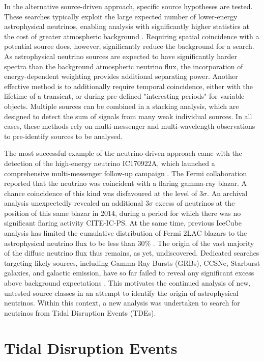 \documentclass{PoS}
\begin{document}
In the alternative source-driven approach, specific source hypotheses are tested. These searches typically exploit the large expected number of lower-energy astrophysical neutrinos, enabling analysis with significantly higher statistics at the cost of greater atmospheric background \cite{Aartsen:2016oji}. Requiring spatial coincidence with a potential source does, however, significantly reduce the background for a search. As astrophysical neutrino sources are expected to have significantly harder spectra than the background atmospheric neutrino flux, the incorporation of energy-dependent weighting provides additional separating power. Another effective method is to additionally require temporal coincidence, either with the lifetime of a transient, or during  pre-defined "interesting periods" for variable objects.  Multiple sources can be combined in a stacking analysis, which are designed to detect the sum of signals from many weak individual sources. In all cases, these methods rely on multi-messenger and multi-wavelength observations to pre-identify sources to be analysed.

The most successful example of the neutrino-driven approach came with the detection of the high-energy neutrino IC170922A, which launched a comprehensive multi-messenger follow-up campaign \cite{IceCube:2018dnn}. The Fermi collaboration reported that the neutrino was coincident with a flaring gamma-ray blazar. A chance coincidence of this kind was disfavoured at the level of 3$\sigma$. An archival analysis unexpectedly revealed an additional 3$\sigma$ excess of neutrinos at the position of this same blazar in 2014, during a period for which there was no significant flaring activity CITE-IC-PS. At the same time, previous IceCube analysis has limited the cumulative distribution of Fermi 2LAC blazars to the astrophysical neutrino flux to be less than 30\% \cite{Aartsen:2016lir}. The origin of the vast majority of the diffuse neutrino flux thus remains, as yet, undiscovered. Dedicated searches targeting likely sources, including Gamma-Ray Bursts (GRBs), CCSNe, Starburst galaxies, and galactic emission, have so far failed to reveal any significant excess above background expectations \cite{Stasik2018Search}. This motivates the continued analysis of new, untested source classes in an attempt to identify the origin of astrophysical neutrinos. Within this context, a new analysis was undertaken to search for neutrinos from Tidal Disruption Events (TDEs).

\section{Tidal Disruption Events}
\end{document}
